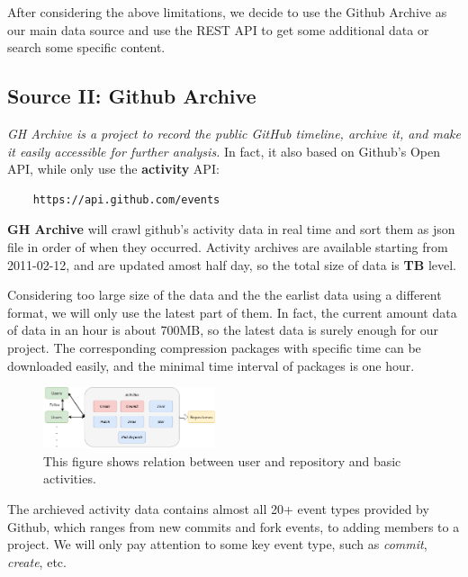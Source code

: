 After considering the above limitations, we decide to use the Github Archive\cite{gha} as our main data source and use the REST API to get some additional data or search some specific content.


\subsection{Source II: Github Archive}

\textit{GH Archive\cite{gha} is a project to record the public GitHub timeline, archive it, and make it easily accessible for further analysis.} In fact, it also based on Github's Open API, while only use the \textbf{activity} API:



\begin{verbatim}
    https://api.github.com/events
\end{verbatim}


\textbf{GH Archive} will crawl github's activity data in real time and sort them as json file in order of when they occurred. Activity archives are available starting from 2011-02-12, and are updated amost half day, so the total size of data is \textbf{TB} level. 

Considering too large size of the data and the the earlist data using a different format, we will only use the latest part of them. In fact, the current amount data of data in an hour is about 700MB, so the latest data is surely enough for our project. The corresponding compression packages with specific time can be downloaded easily, and the minimal time interval of packages is one hour. 

\begin{figure}[H]
    \centering
    \includegraphics[width=0.45\textwidth]{./pic/github.png}
    \caption{This figure shows relation between user and repository and basic activities.}
    \label{fig:github}
\end{figure}


The archieved activity data contains almost all 20+ event types provided by Github, which ranges from new commits and fork events, to adding members to a project. We will only pay attention to some key event type, such as \textit{commit}, \textit{create}, etc.


